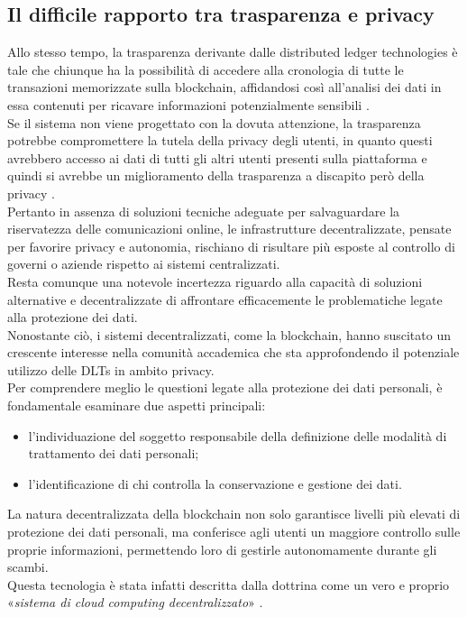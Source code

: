 \subsection{Il difficile rapporto tra trasparenza e privacy}
Allo stesso tempo, la trasparenza derivante dalle distributed ledger technologies è tale che chiunque ha la possibilità di accedere alla
cronologia di tutte le transazioni memorizzate sulla blockchain, affidandosi così all’analisi dei dati in essa contenuti per ricavare informazioni potenzialmente sensibili \cite{marr_history_blockchain_2018}.
\\Se il sistema non viene progettato con la dovuta attenzione, la trasparenza potrebbe compromettere la tutela della privacy degli utenti, in quanto questi avrebbero
accesso ai dati di tutti gli altri utenti presenti sulla piattaforma e quindi si avrebbe un miglioramento della trasparenza 
a discapito però della privacy \cite{zambardino_blockchain_2022} \cite{mayes_privacy_transparency_2018}.\\
Pertanto in assenza di soluzioni tecniche adeguate per salvaguardare la riservatezza delle comunicazioni online, le infrastrutture decentralizzate, pensate per favorire privacy e autonomia, 
rischiano di risultare più esposte al controllo di governi o aziende rispetto ai sistemi centralizzati.
\\Resta comunque una notevole incertezza riguardo alla capacità di soluzioni alternative e decentralizzate di affrontare efficacemente le problematiche legate alla protezione dei dati.
\\Nonostante ciò, i sistemi decentralizzati, come la blockchain, hanno suscitato un crescente interesse nella comunità accademica che sta approfondendo il potenziale utilizzo delle DLTs in ambito privacy.
\\Per comprendere meglio le questioni legate alla protezione dei dati personali, è fondamentale esaminare due aspetti principali:
\begin{itemize}
    \item l'individuazione del soggetto responsabile della definizione delle modalità di trattamento dei dati personali;
    \item l'identificazione di chi controlla la conservazione e gestione dei dati.
\end{itemize}
La natura decentralizzata della blockchain non solo garantisce livelli più elevati di protezione dei dati personali, ma conferisce agli utenti un maggiore controllo sulle proprie informazioni, permettendo loro di gestirle autonomamente durante gli scambi. \\Questa tecnologia è stata infatti descritta dalla dottrina come un vero e proprio «\textit{sistema di cloud computing decentralizzato}» \cite{bridge_blockchain_2018}.
